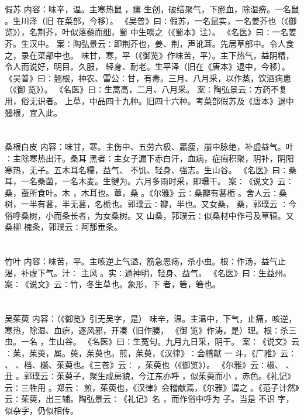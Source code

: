 \documentclass[12pt,UTF8]{ctexbook}
\begin{document}
\section{}假苏
内容：味辛，温。主寒热鼠 ，瘰 生创，破结聚气，下瘀血，除湿痹。一名鼠 。生川泽（旧 
在菜部，今移）。 
《吴普》曰∶假苏，一名鼠实，一名姜芥也（《御览》），名荆芥，叶似落藜而细，蜀 
中生啖之（《蜀本》注）。 
《名医》曰∶一名姜芥。生汉中。 
案∶陶弘景云∶即荆芥也，姜、荆，声讹耳。先居草部中。令人食之，录在菜部中也。 
味甘，寒，平（《御览》作味苦，平）。主下热气，益阴精，令人而说好，明目。久服， 
轻身、耐老。生平泽（旧在《唐本》退中，今移）。 
《吴普》曰∶翘根，神农、雷公∶甘，有毒。三月、八月采，以作蒸，饮酒病患（《御 
览》）。 
《名医》曰∶生蒿高，二月、八月采。 
案∶陶弘景云∶方药不复用，俗无识者。 
上草，中品四十九种。旧四十六种。考菜部假苏及《唐本》退中翘根，宜入此。 


\section{}桑根白皮
内容：味甘，寒。主伤中、五劳六极、羸瘦，崩中脉绝，补虚益气。叶∶主除寒热出汗。桑耳 
黑者∶主女子漏下赤白汗，血病，症瘕积聚，阴补，阴阳寒热，无子。五木耳名糯，益气、 
不饥、轻身、强志。生山谷。 
《名医》曰∶桑耳，一名桑菌，一名木麦。生犍为。六月多雨时采，即曝干。 
案∶《说文》云∶桑，蚕所食叶。木 ，木耳也。蕈，桑 。《尔雅》云∶桑瓣有葚栀 
。舍人云∶桑树，一半有葚，半无葚，名栀也。郭璞云∶瓣，半也。又女桑， 桑，郭璞云 
∶今俗呼桑树，小而条长者，为女桑树。又 山桑，郭璞云∶似桑材中作弓及草辕。又桑柳 
槐条，郭璞云∶阿那垂条。 


\section{}竹叶
内容：味苦，平。主咳逆上气溢，筋急恶疡，杀小虫。根∶作汤，益气止渴，补虚下气。汁∶ 
主风 。实∶通神明，轻身、益气。 
《名医》曰∶生益州。 
案∶《说文》云∶竹，冬生草也。象形，下 者，箬，箬也。 


\section{}吴茱萸
内容：（《御览》引无吴字，是） 
味辛，温。主温中，下气，止痛，咳逆，寒热，除湿、血痹，逐风邪，开凑（旧作腠， 
《御 
览》作涛，是）理。根∶杀三虫。一名 ，生山谷。 
《名医》曰∶生冤句。九月九日采，阴干。 
案∶《说文》云∶茱，茱萸，属。萸，茱萸也。煎，茱萸，《汉律》∶会稽献 一 
斗。《广雅》云∶ 、 、档、樾、茱萸也。《三苍》云∶ ，茱萸也（《御览》）。 
《尔雅》云∶椒、 、丑 。郭璞云∶茱萸子，聚生成房貌，今江东亦呼 ，似茱萸而小 
，赤色。《礼记》云∶三牲用 。郑云∶ 煎，茱萸也，《汉律》会稽献焉，《尔雅》谓之 
。《范子计然》云∶茱萸，出三辅。陶弘景云∶《礼记》名 ，而作俗中呼为 子。当是 
不识 字，似杂字，仍似相传。 
\end{document}
